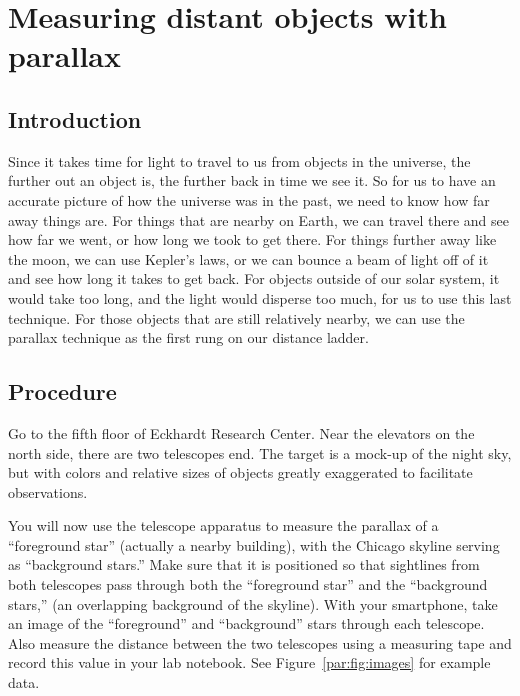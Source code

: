 \chapter{Measuring distant objects with parallax}


\section{Introduction}

Since it takes time for light to travel to us from objects in the universe, the further out an object is, the further back in time we see it. So for us to have an accurate picture of how the universe was in the past, we need to know how far away things are. For things that are nearby on Earth, we can travel there and see how far we went, or how long we took to get there. For things further away like the moon, we can use Kepler's laws, or we can bounce a beam of light off of it and see how long it takes to get back. For objects outside of our solar system, it would take too long, and the light would disperse too much, for us to use this last technique. For those objects that are still relatively nearby, we can use the parallax technique as the first rung on our distance ladder.

\section{Procedure}

Go to the fifth floor of Eckhardt Research Center. Near the elevators on the north side, there are
two telescopes%
end. The target is a mock-up of the night sky, but with colors and relative sizes of objects
greatly exaggerated to facilitate observations.

You will now use the telescope apparatus to measure the parallax of a “foreground star”
(actually a nearby building), with the
Chicago skyline
serving as “background stars.”
Make sure that it is positioned so that sightlines from both telescopes
pass through both the “foreground star” and the “background stars,”
(an overlapping background of the skyline).
With your smartphone, take an image of the “foreground” and “background” stars through each telescope.
Also measure the distance between the two telescopes using a measuring tape and record
this value in your lab notebook. See Figure~\ref{par:fig:images} for example data.

